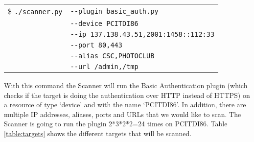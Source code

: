\begin{table}[H]
\begin{center}
    \begin{tabular}{ c  l }


\$ \texttt{./scanner.py} &  \texttt{-{}-plugin basic\_auth.py}  \\
			   &  \texttt{-{}-device PCITDI86}  \\
			   &  \texttt{-{}-ip 137.138.43.51,2001:1458::112:33} \\
	           &  \texttt{-{}-port 80,443  }\\
	           &   \texttt{-{}-alias CSC,PHOTOCLUB}  \\
    	       &  \texttt{-{}-url /admin,/tmp}
    	       
	\end{tabular}
    
   \end{center}
\end{table}
\noindent
With this command the Scanner will run the Basic Authentication plugin (which checks if the target is doing the authentication over HTTP instead of HTTPS) on a resource of type `device' and with the name `PCITDI86'. In addition, there are multiple IP addresses, aliases, ports and URLs that we would like to scan. The Scanner is going to run the plugin 2*3*2*2=24 times on PCITDI86. Table \ref{table:targets} shows the different targets that will be scanned. 

